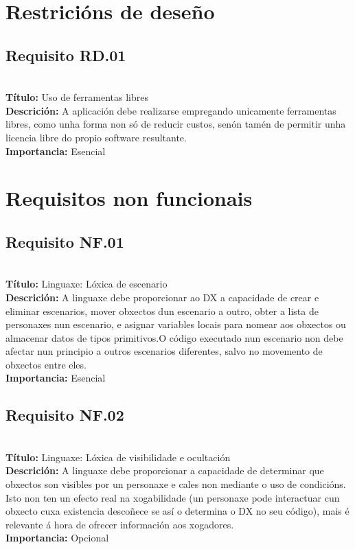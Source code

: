\section{Restricións de deseño}

\subsection{Requisito RD.01}~\\
{\bf Título:} Uso de ferramentas libres\\
{\bf Descrición:} A aplicación debe realizarse empregando unicamente
ferramentas libres, como unha forma non só de reducir custos, senón tamén de
permitir unha licencia libre do propio software resultante.\\
{\bf Importancia:} Esencial


\section{Requisitos non funcionais}

\subsection{Requisito NF.01}~\\
{\bf Título:} Linguaxe: Lóxica de escenario\\
{\bf Descrición:} A linguaxe debe proporcionar ao DX a capacidade de crear e
eliminar escenarios, mover obxectos dun escenario a outro, obter a lista de
personaxes nun escenario, e asignar variables locais para nomear aos obxectos ou
almacenar datos de tipos primitivos.O código executado nun escenario non debe
afectar nun principio a outros escenarios diferentes, salvo no movemento de
obxectos entre eles.\\
{\bf Importancia:} Esencial

\subsection{Requisito NF.02}~\\
{\bf Título:} Linguaxe: Lóxica de visibilidade e ocultación\\
{\bf Descrición:} A linguaxe debe proporcionar a capacidade de determinar que
obxectos son visibles por un personaxe e cales non mediante o uso de
condicións. Isto non ten un efecto real na xogabilidade (un personaxe pode
interactuar cun obxecto cuxa existencia descoñece se así o determina o DX no
seu código), mais é relevante á hora de ofrecer información aos xogadores. \\
{\bf Importancia:} Opcional

